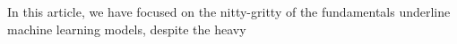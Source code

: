In this article, we have focused on the nitty-gritty of the fundamentals underline machine learning models, despite the heavy 